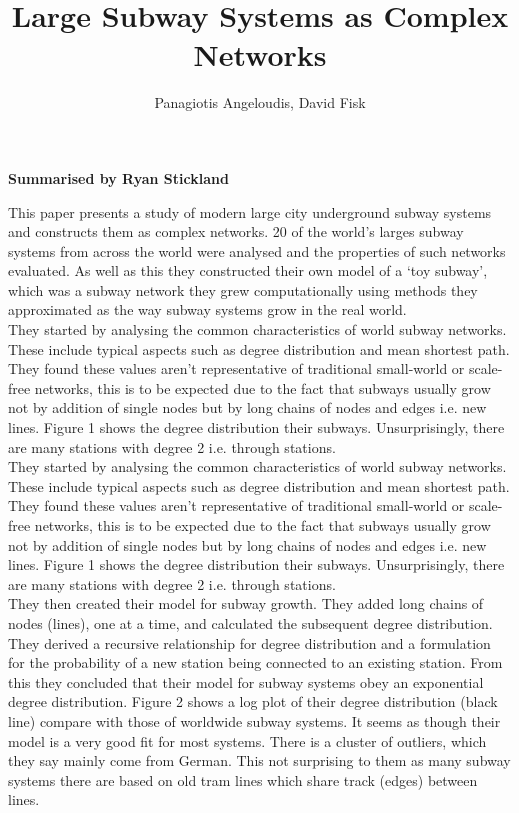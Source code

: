 \documentclass[11pt]{article}
\title{\textbf{Large Subway Systems as Complex Networks}}
\author{Panagiotis Angeloudis, David Fisk}
\begin{document}
\maketitle

\begin{center}
\textbf{Summarised by Ryan Stickland}
\end{center}

This paper presents a study of modern large city underground subway systems and constructs them as complex networks. 20 of the world’s larges subway systems from across the world were analysed and the properties of such networks evaluated. As well as this they constructed their own model of a ‘toy subway’, which was a subway network they grew computationally using methods they approximated as the way subway systems grow in the real world.\\

They started by analysing the common characteristics of world subway networks. These include typical aspects such as degree distribution and mean shortest path. They found these values aren’t representative of traditional small-world or scale-free networks, this is to be expected due to the fact that subways usually grow not by addition of single nodes but by long chains of nodes and edges i.e. new lines. Figure 1 shows the degree distribution their subways. Unsurprisingly, there are many stations with degree 2 i.e. through stations.\\

They started by analysing the common characteristics of world subway networks. These include typical aspects such as degree distribution and mean shortest path. They found these values aren’t representative of traditional small-world or scale-free networks, this is to be expected due to the fact that subways usually grow not by addition of single nodes but by long chains of nodes and edges i.e. new lines. Figure 1 shows the degree distribution their subways. Unsurprisingly, there are many stations with degree 2 i.e. through stations.\\

They then created their model for subway growth. They added long chains of nodes (lines), one at a time, and calculated the subsequent degree distribution. They derived a recursive relationship for degree distribution and a formulation for the probability of a new station being connected to an existing station. From this they concluded that their model for subway systems obey an exponential degree distribution. Figure 2 shows a log plot of their degree distribution (black line) compare with those of worldwide subway systems. It seems as though their model is a very good fit for most systems. There is a cluster of outliers, which they say mainly come from German. This not surprising to them as many subway systems there are based on old tram lines which share track (edges) between lines.\\
\end{document}
